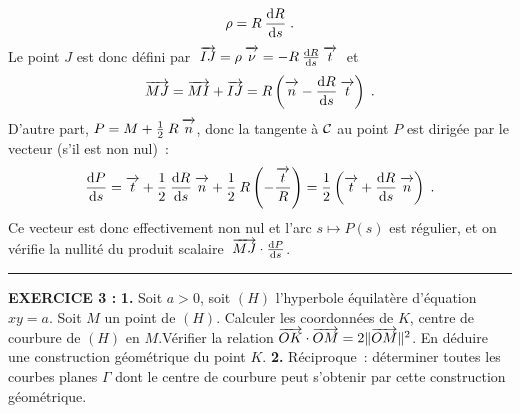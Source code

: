 \documentclass{article}
\begin{document}
$$\rho=R\>{{\rm d}R\over{\rm d}s}\;.$$
Le point $J$ est donc d\'efini par $\;\vect{IJ}=\rho\>\vect{\nu}=-R\>{{\rm d}R\s{\rm d}s}\>\vect{t}\;$ et
$$\vect{MJ}=\vect{MI}+\vect{IJ}=R\lp\vect{n}-{{\rm d}R\s{\rm d}s}\>\vect{t}\rp\;.$$
D'autre part, $P=M+{1\s2}\>R\>\vect{n}$, donc la tangente \`a ${\cal C}$ au point $P$ est dirig\'ee par le vecteur (s'il est non nul)~:
$${{\rm d}P\s{\rm d}s}=\vect{t}+{1\s2}\>{{\rm d}R\s{\rm d}s}\>\vect{n}+{1\s2}\>R\lp-{\vect{t}\s R}\rp={1\s2}\lp\vect{t}+{{\rm d}R\s{\rm d}s}\>\vect{n}\rp\;.$$
Ce vecteur est donc effectivement non nul et l'arc $s\mapsto P(s)$ est r\'egulier, et on v\'erifie la nullit\'e du produit scalaire $\;\vect{MJ}\cdot{{\rm d}P\s{\rm d}s}$.

\bsk
\hrule
\bsk

{\bf EXERCICE 3 :}\msk
{\bf 1.} Soit $a>0$, soit $(H)$ l'hyperbole \'equilat\`ere d'\'equation $xy=a$.
Soit $M$ un point de $(H)$. Calculer les coordonn\'ees de $K$, centre de
courbure de $(H)$ en $M$.\ssk\sect V\'erifier la relation $\vect{OK}\cdot\vect{OM}=
2\|\vect{OM}\|^2$. En d\'eduire une construction g\'eom\'etrique du point $K$.\msk
{\bf 2.} R\'eciproque~: d\'eterminer toutes les courbes planes $\Gamma$ dont le centre de courbure peut s'obtenir par cette construction g\'eom\'etrique.

\msk
\cl{- - - - - - - - - - - - - - - - - - - - - - - - - - - - - - - }
\msk
\end{document}

